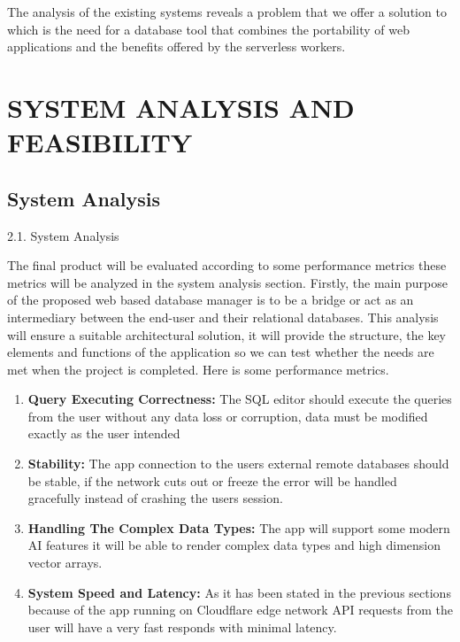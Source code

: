 The analysis of the existing systems reveals a problem that we offer a solution to which is the need for a database tool that combines the portability of web applications and the benefits offered by the serverless workers.

\chapter{SYSTEM ANALYSIS AND FEASIBILITY}
\section{System Analysis}

2.1. System Analysis

The final product will be evaluated according to some performance metrics these metrics will be analyzed in the system analysis section. Firstly, the main purpose of the proposed web based database manager is to be a bridge or act as an intermediary between the end-user and their relational databases. This analysis will ensure a suitable architectural solution, it will provide the structure, the key elements and functions of the application so we can test whether the needs are met when the project is completed. Here is some performance metrics. 

\begin{enumerate}
    \item \textbf{Query Executing Correctness:} 
    The SQL editor should execute the queries from the user without any data loss or corruption, data must be modified exactly as the user intended
    \item \textbf{Stability:}  
    The app connection to the users external remote databases should be stable, if the network cuts out or freeze the error will be handled gracefully  instead of crashing the users session.
    \item \textbf{Handling The Complex Data Types:} 
    The app will support some modern AI features it will be able to render complex data types and high dimension vector arrays.
    \item \textbf{System Speed and Latency:} 
     As it has been stated in the previous sections because of the app running on Cloudflare edge network API requests from the user will have a very fast responds with minimal latency.
    
\end{enumerate}













